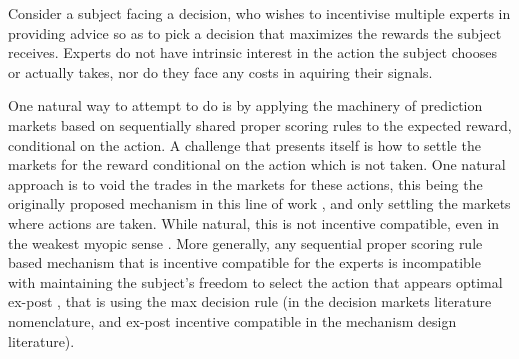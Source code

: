 


Consider a subject facing a decision, who wishes to incentivise multiple experts in providing advice so as to pick a decision that maximizes the rewards the subject receives.
Experts do not have intrinsic interest in the action the subject chooses or actually takes, nor do they face any costs in aquiring their signals.

One natural way to attempt to do is by applying the machinery of prediction markets based on sequentially shared proper scoring rules to the expected reward, conditional on the action. 
A challenge that presents itself is how to settle the markets for the reward conditional on the action which is not taken.
One natural approach is to void the trades in the markets for these actions, this being the originally proposed mechanism in this line of work \cite{hanson2002decision}, and only settling the markets where actions are taken.
While natural, this is not incentive compatible, even in the weakest myopic sense \cite{othman2010decision}. 
More generally, any sequential proper scoring rule based mechanism that is incentive compatible for the experts is incompatible with maintaining the subject's freedom to select the action that appears optimal ex-post \cite{othman2010decision,  chen2014eliciting}, that is using the max decision rule (in the decision markets literature nomenclature, and ex-post incentive compatible in the mechanism design literature). 

